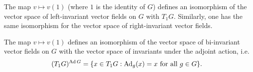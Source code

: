 \begin{theorem}
  The map $v \mapsto v(1)$ (where $1$ is
  the identity of $G$) defines an
  isomorphism of the vector space
  of left-invariant vector fields on $G$
  with $T_1 G$. Similarly, one has the
  same isomorphism for the
  vector space of right-invariant
  vector fields.
\end{theorem}

\begin{theorem}
  The map $v \mapsto v(1)$ defines an
  isomorphism of the vector space of
  bi-invariant vector fields on $G$
  with the vector space of invariants
  under the adjoint action, i.e.
  \[
    (T_1 G)^{\operatorname{Ad} G}
    = \{x \in T_1 G : \operatorname{Ad}_g(x) = x \text{ for all } g \in G\}.
  \]
\end{theorem}
